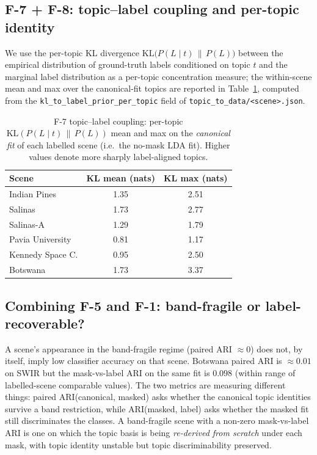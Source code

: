 \documentclass[journal,a4paper,10pt]{IEEEtran}
\begin{document}
\subsection{F-7 + F-8: topic--label coupling and per-topic identity}

We use the per-topic KL divergence
$\mathrm{KL}\!\big(P(L \mid t) \,\|\, P(L)\big)$ between the empirical
distribution of ground-truth labels conditioned on topic $t$ and the
marginal label distribution as a per-topic concentration measure;
the within-scene mean and max over the canonical-fit topics
are reported in Table~\ref{tab:b7-coupling}, computed from the
\texttt{kl\_to\_label\_prior\_per\_topic} field of
\texttt{topic\_to\_data/<scene>.json}.

\begin{table}[t]
\caption{F-7 topic--label coupling: per-topic
$\mathrm{KL}(P(L\mid t) \,\|\, P(L))$ mean and max on the
\emph{canonical fit} of each labelled scene (i.e.\ the no-mask
LDA fit). Higher values denote more sharply label-aligned topics.}
\label{tab:b7-coupling}
\centering
\small
\begin{tabular}{lcc}
\toprule
Scene & KL mean (nats) & KL max (nats) \\
\midrule
Indian Pines     & 1.35 & 2.51 \\
Salinas          & 1.73 & 2.77 \\
Salinas-A        & 1.29 & 1.79 \\
Pavia University & 0.81 & 1.17 \\
Kennedy Space C. & 0.95 & 2.50 \\
Botswana         & 1.73 & 3.37 \\
\bottomrule
\end{tabular}
\end{table}

\subsection{Combining F-5 and F-1: band-fragile or label-recoverable?}

A scene's appearance in the band-fragile regime (paired ARI
$\approx 0$) does not, by itself, imply low classifier accuracy on
that scene. Botswana paired ARI is $\approx 0.01$ on SWIR but the
mask-vs-label ARI on the same fit is $0.098$ (within range of
labelled-scene comparable values). The two metrics are measuring
different things: paired ARI(canonical, masked) asks whether the
canonical topic identities survive a band restriction, while
ARI(masked, label) asks whether the masked fit still discriminates
the classes. A band-fragile scene with a non-zero mask-vs-label ARI
is one on which the topic basis is being \emph{re-derived from
scratch} under each mask, with topic identity unstable but topic
discriminability preserved.
\end{document}
